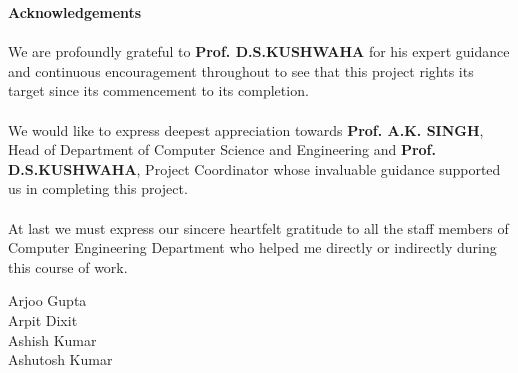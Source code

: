 \begin{center}
\thispagestyle{empty}
\LARGE{\textbf{Acknowledgements}}\\[1cm]
\end{center}
\linespread{1.13}
\large{\paragraph{}We are profoundly grateful to \textbf{Prof. D.S.KUSHWAHA } for his expert guidance
and continuous encouragement throughout to see that this project rights its
target since its commencement to its completion.}
\large{\paragraph{}We would like to express deepest appreciation towards \textbf{Prof. A.K. SINGH}, 
Head of Department of Computer Science and  Engineering and \textbf{Prof. D.S.KUSHWAHA}, Project Coordinator whose
invaluable guidance supported us in completing this project.}
\large{\paragraph{}At last we must express our sincere heartfelt gratitude to all the staff members
of Computer Engineering Department who helped me directly or indirectly during this course of work.}
\begin{flushright}
{
Arjoo Gupta\\
Arpit Dixit\\
Ashish Kumar\\
Ashutosh Kumar
}
\end{flushright}
\newpage
